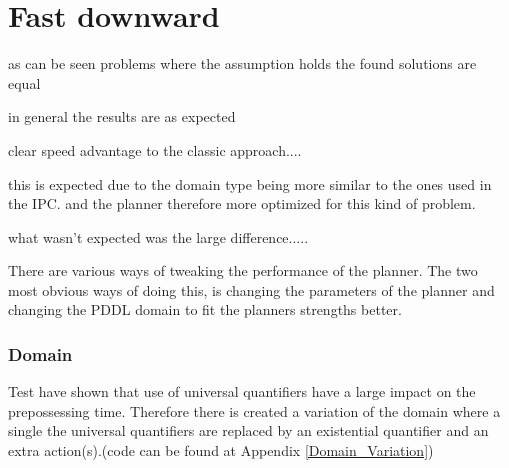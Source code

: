\section{Fast downward}
	
	
		
			
			as can be seen problems where the assumption holds the found solutions are equal
			
			
			in general the results are as expected
		
		
			clear speed advantage to the classic approach....
			
			this is expected due to the domain type being more similar to the ones used in the IPC. and the planner therefore more optimized for this kind of problem.
			
			what wasn't expected was the large difference.....
			
			
			 

There are various ways of tweaking the performance of the planner. The two most obvious ways of doing this, is changing the parameters of the planner and changing the PDDL domain to fit the planners strengths better.

\subsubsection{Domain}
Test have shown that use of universal quantifiers have a large impact on the prepossessing time. Therefore there is created a variation of the domain where a single the universal quantifiers are replaced by an existential quantifier and an extra action(s).(code can be found at Appendix \ref{Domain_Variation})

